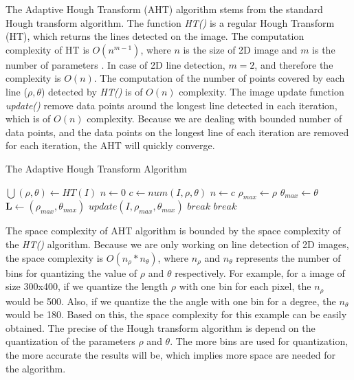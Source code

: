 The Adaptive Hough Transform (AHT) algorithm stems from
the standard Hough transform algorithm.
The function {\it HT()} is a regular Hough Transform (HT),
which returns the lines detected on the image.
The computation complexity of HT is
$O(n^{m-1})$, where $n$ is the size of 2D image
and $m$ is the number of parameters \cite{Hough}.
In case of 2D line detection, $m = 2$, and therefore
the complexity is $O(n)$.
The computation of the number of points covered by
each line  ($\rho, \theta$) detected by {\it HT()} is of $O(n)$ complexity.
The image update function {\it update()}
remove data points around the longest line
detected in each iteration, which is of $O(n)$ complexity.
Because we are dealing with bounded number of data points,
and the data points on the longest line of each iteration are removed for each iteration,
the AHT will quickly converge.

\begin{algorithm}
\caption{The Adaptive Hough Transform Algorithm}
\label{alg.AHT}
\begin{algorithmic}[1]
\State $\bigcup{(\rho, \theta)} \leftarrow HT (I)$
\State $n \leftarrow 0 $
     \State $c \leftarrow num(I, \rho, \theta)$
         \State $n \leftarrow c$
         \State $\rho_{max} \leftarrow \rho$
         \State $\theta_{max} \leftarrow \theta$
     \EndIf
\EndFor
{}   
\State $\boldsymbol{L} \leftarrow (\rho_{max}, \theta_{max})$
\State $update(I, \rho_{max}, \theta_{max})$
\Else
\State $break$
\EndIf
{} 
\State $break$
\EndIf
\EndWhile
\EndProcedure
\end{algorithmic}
\end{algorithm}

The space complexity of AHT algorithm is bounded
by the space complexity of the {\it HT()} algorithm.
Because we are only working on line detection of 2D images,
the space complexity is $O(n_\rho * n_\theta)$,
where $n_\rho$ and $n_\theta$ represents the number of bins
for quantizing the value of $\rho$ and $\theta$ respectively.
For example, for a image of size 300x400, if we quantize the length $\rho$
with one bin for each pixel, the $n_\rho$ would be 500. Also,
if we quantize the the angle with one bin for a degree,
the $n_\theta$ would be 180.
Based on this, the space complexity for this example can be easily obtained.
The precise of the Hough transform algorithm is depend on the quantization
of the parameters $\rho$ and $\theta$.
The more bins are used for quantization,
the more accurate the results will be,
which implies more space are needed for the algorithm.


